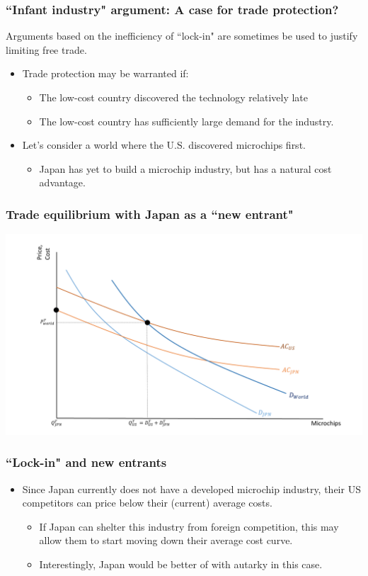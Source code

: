 \documentclass{beamer}
\begin{document}
\begin{frame}
	\frametitle{``Infant industry" argument: A case for trade protection?}
Arguments based on the inefficiency of ``lock-in" are sometimes be used to justify limiting free trade.
	\begin{itemize}
		\item Trade protection may be warranted if:
			\begin{itemize}
				\item The low-cost country discovered the technology relatively late
				\item The low-cost country has sufficiently large demand for the industry. 
			\end{itemize}
		\item Let's consider a world where the U.S. discovered microchips first.
			\begin{itemize}
				\item Japan has yet to build a microchip industry, but has a natural cost advantage. 
			\end{itemize}
	\end{itemize}
\end{frame}

\begin{frame}
	\frametitle{Trade equilibrium with Japan as a ``new entrant"}
	\includegraphics[scale=0.32]{SL4_24.pdf}
\end{frame}

\begin{frame}
	\frametitle{``Lock-in" and new entrants}
	\begin{itemize}
		\item Since Japan currently does not have a developed microchip industry, their US competitors can price below their (current) average costs.
			\begin{itemize}
				\item If Japan can shelter this industry from foreign competition, this may allow them to start moving down their average cost curve.
				\item Interestingly, Japan would be better of with autarky in this case.
			\end{itemize} 
	\end{itemize}
\end{frame}
\end{document}

